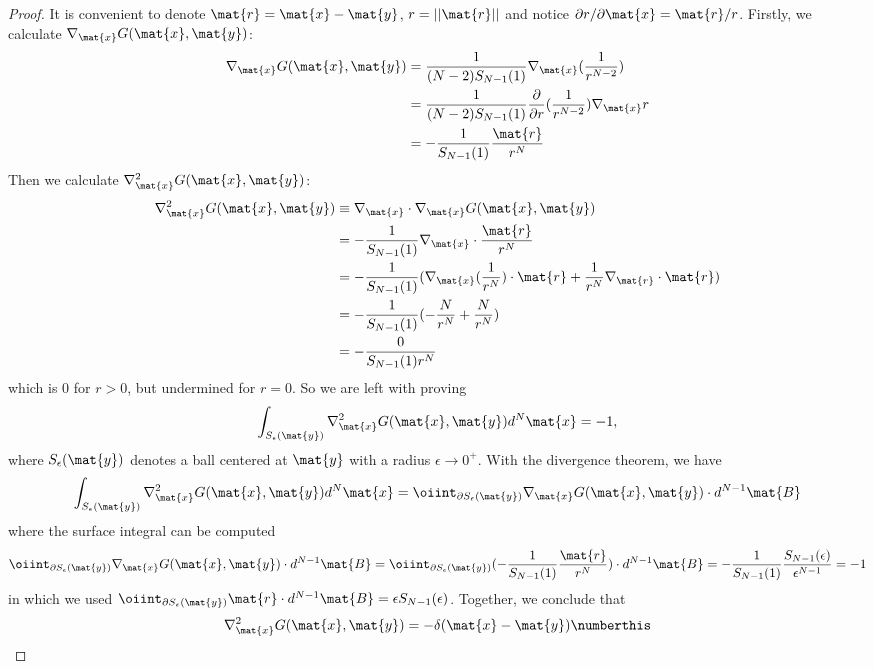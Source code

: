\begin{proof}
It is convenient to denote $\mat{r}=\mat{x}-\mat{y}$, $r=||\mat{r}||$ and notice $\partial r/\partial \mat{x}=\mat{r}/r$. Firstly, we calculate $\nabla_{\mat{x}} G(\mat{x},\mat{y})$:
\begin{equation}
\begin{aligned}
    \nabla_{\mat{x}} G(\mat{x}, \mat{y}) & = \frac{1}{(N-2)S_{N-1}(1)}\nabla_{\mat{x}}(\frac{1}{r^{N-2}}) \\
    & = \frac{1}{(N-2)S_{N-1}(1)} \frac{\partial}{\partial r}(\frac{1}{r^{N-2}})\nabla_\mat{x}r \\
    & = -\frac{1}{S_{N-1}(1)}\frac{\mat{r}}{r^N}
\end{aligned}
\end{equation}
Then we calculate $\nabla_{\mat{x}}^2 G(\mat{x},\mat{y})$:
\begin{equation}
    \begin{aligned}
        \nabla_{\mat{x}}^2 G(\mat{x},\mat{y}) &\equiv \nabla_{\mat{x}}\cdot\nabla_{\mat{x}}G(\mat{x},\mat{y}) \\
        & = -\frac{1}{S_{N-1}(1)}\nabla_{\mat{x}}\cdot \frac{\mat{r}}{r^N} \\ 
        & = -\frac{1}{S_{N-1}(1)}(\nabla_{\mat{x}}(\frac{1}{r^N})\cdot\mat{r}+\frac{1}{r^N}\nabla_{\mat{r}}\cdot\mat{r}) \\
        & = -\frac{1}{S_{N-1}(1)}(-\frac{N}{r^N}+\frac{N}{r^N}) \\
        & = -\frac{0}{S_{N-1}(1)r^N}
    \end{aligned}
\end{equation}
which is 0 for $r>0$, but undermined for $r=0$. So we are left with proving
\begin{equation}
    \int_{S_\epsilon(\mat{y})}\nabla_{\mat{x}}^2 G(\mat{x},\mat{y}) d^N\mat{x} = -1,
\end{equation}
where $S_\epsilon(\mat{y})$ denotes a ball centered at $\mat{y}$ with a radius $\epsilon\to 0^+$. With the divergence theorem, we have
\begin{equation}
    \int_{S_\epsilon(\mat{y})}\nabla_{\mat{x}}^2 G(\mat{x},\mat{y}) d^N\mat{x} =  \oiint_{\partial S_\epsilon(\mat{y})} \nabla_{\mat{x}}G(\mat{x},\mat{y})\cdot d^{N-1}\mat{B}
\end{equation}
where the surface integral can be computed
\begin{equation}
    \oiint_{\partial S_\epsilon(\mat{y})} \nabla_{\mat{x}}G(\mat{x},\mat{y})\cdot d^{N-1}\mat{B}  = \oiint_{\partial S_\epsilon(\mat{y})} (-\frac{1}{S_{N-1}(1)}\frac{\mat{r}}{r^N})\cdot d^{N-1}\mat{B} = -\frac{1}{S_{N-1}(1)}\frac{S_{N-1}(\epsilon)}{\epsilon^{N-1}} = -1
\end{equation}
in which we used $\oiint_{\partial S_\epsilon(\mat{y})}\mat{r}\cdot d^{N-1}\mat{B}=\epsilon S_{N-1}(\epsilon)$. Together, we conclude that
\begin{align*}
    \nabla^2_{\mat{x}} G(\mat{x},\mat{y})=-\delta(\mat{x}-\mat{y}) \numberthis \label{eq:G-delta}
\end{align*}





\end{proof}
